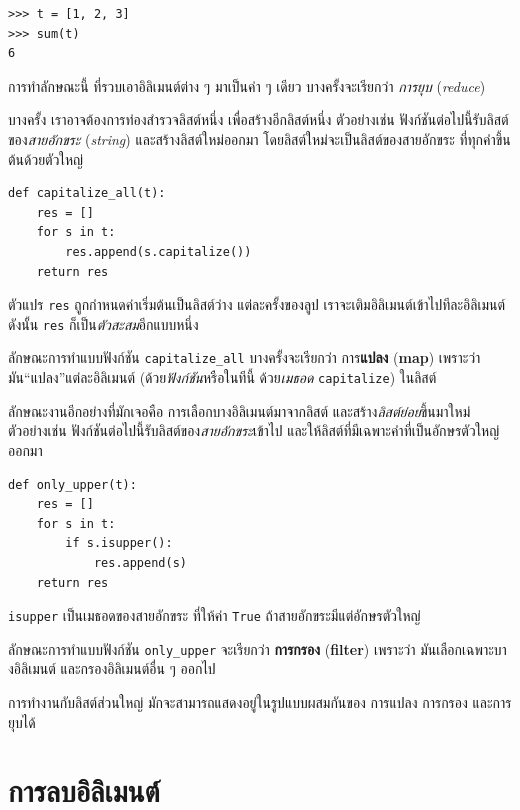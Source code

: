 \begin{verbatim}
>>> t = [1, 2, 3]
>>> sum(t)
6
\end{verbatim}
%
การทำลักษณะนี้ ที่รวบเอาอิลิเมนต์ต่าง ๆ มาเป็นค่า ๆ เดียว
บางครั้งจะเรียกว่า \textit{การยุบ} (\textit{reduce})

บางครั้ง เราอาจต้องการท่องสำรวจลิสต์หนึ่ง เพื่อสร้างอีกลิสต์หนึ่ง  
ตัวอย่างเช่น ฟังก์ชันต่อไปนี้รับลิสต์ของ\textit{สายอักขระ} (\textit{string}) และสร้างลิสต์ใหม่ออกมา โดยลิสต์ใหม่จะเป็นลิสต์ของสายอักขระ ที่ทุกคำขึ้นต้นด้วยตัวใหญ่

\begin{verbatim}
def capitalize_all(t):
    res = []
    for s in t:
        res.append(s.capitalize())
    return res
\end{verbatim}
%
ตัวแปร \texttt{res} ถูกกำหนดค่าเริ่มต้นเป็นลิสต์ว่าง
แต่ละครั้งของลูป เราจะเติมอิลิเมนต์เข้าไปทีละอิลิเมนต์  
ดังนั้น \texttt{res} ก็เป็น\textit{ตัวสะสม}อีกแบบหนึ่ง

ลักษณะการทำแบบฟังก์ชัน \verb|capitalize_all| 
บางครั้งจะเรียกว่า การ\textbf{แปลง} (\textbf{map})
เพราะว่า มัน``แปลง''แต่ละอิลิเมนต์ (ด้วย\textit{ฟังก์ชัน}หรือในทีนี้ ด้วย\textit{เมธอด} \texttt{capitalize}) ในลิสต์

ลักษณะงานอีกอย่างที่มักเจอคือ การเลือกบางอิลิเมนต์มาจากลิสต์
และสร้าง\textit{ลิสต์ย่อย}ขึ้นมาใหม่
ตัวอย่างเช่น ฟังก์ชันต่อไปนี้รับลิสต์ของ\textit{สายอักขระ}เข้าไป และให้ลิสต์ที่มีเฉพาะคำที่เป็นอักษรตัวใหญ่ออกมา

\begin{verbatim}
def only_upper(t):
    res = []
    for s in t:
        if s.isupper():
            res.append(s)
    return res
\end{verbatim}
%
\texttt{isupper} เป็นเมธอดของสายอักขระ ที่ให้ค่า \texttt{True} ถ้าสายอักขระมีแต่อักษรตัวใหญ่

ลักษณะการทำแบบฟังก์ชัน \verb|only_upper| จะเรียกว่า
\textbf{การกรอง} (\textbf{filter})
เพราะว่า มันเลือกเฉพาะบางอิลิเมนต์ และกรองอิลิเมนต์อื่น ๆ ออกไป

การทำงานกับลิสต์ส่วนใหญ่ มักจะสามารถแสดงอยู่ในรูปแบบผสมกันของ การแปลง การกรอง และการยุบได้


\section{การลบอิลิเมนต์}

